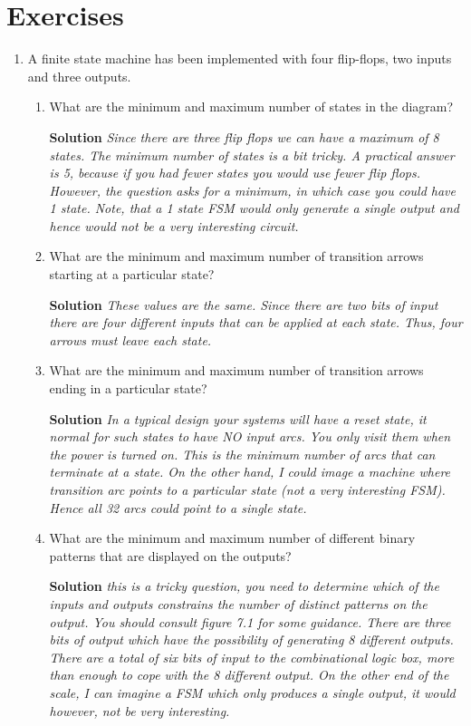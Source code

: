\section{Exercises}
\label{section:finiteStateMachines}
\graphicspath{ {./chapter07/FigHw} }

\begin{enumerate}
\item A finite state machine has been implemented with four
flip-flops, two inputs and three outputs. 
	\begin{enumerate}
	\item What are the minimum and maximum number of states in the diagram?
\begin{onlysolution}  \textbf{Solution} \itshape{
Since there are three flip flops we can have a maximum of 8 states.  The minimum
number of states is a bit tricky.  A practical answer is 5, because if you
had fewer states you would use fewer flip flops.  However, the question
asks for a minimum, in which case you could have 1 state.  Note, that a
1 state FSM would only generate a single output and hence would not be a
very interesting circuit.
}\end{onlysolution} 
	\item What are the minimum and maximum number of transition arrows 
		starting at a particular state?
\begin{onlysolution}  \textbf{Solution} \itshape{
These values are the same.  Since there are two bits of input there are four
different inputs that can be applied at each state.  Thus, four arrows must
leave each state.
}\end{onlysolution} 
	\item What are the minimum and maximum number of transition arrows 
		ending in a particular state?
\begin{onlysolution}  \textbf{Solution} \itshape{
In a typical design your systems will have a reset state, it normal for such
states to have NO input arcs.  You only visit them when the power is turned on.
This is the minimum number of arcs that can terminate at a state.  On the
other hand, I could image a machine where   transition arc points to a
particular state (not a very interesting FSM).  Hence all 32 arcs could point
to a single state.
}\end{onlysolution} 
	\item What are the minimum and maximum number of different binary patterns
		that are displayed on the outputs? 
\begin{onlysolution}  \textbf{Solution} \itshape{
this is a tricky question, you need to determine which of the inputs and outputs
constrains the number of distinct patterns on the output.  You should consult
figure 7.1 for some guidance.  There are three bits of output which have the possibility
of generating 8 different outputs.  There are a total of six bits of input to the
combinational logic box, more than enough to cope with the 8 different output.  On
the other end of the scale, I can imagine a FSM which only produces a single output,
it would however, not be very interesting.
}\end{onlysolution} 
	\end{enumerate}



\end{enumerate}
